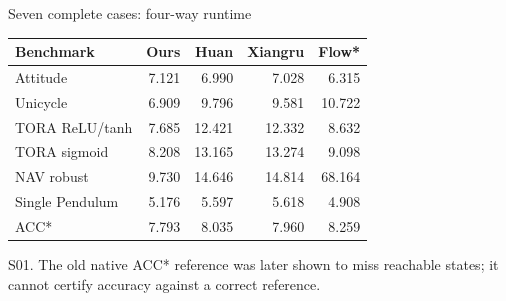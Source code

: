 \documentclass[aspectratio=169,11pt]{beamer}
\newcommand{\src}[1]{\par\vfill{\fontsize{7}{9}\selectfont\color{gray}#1\par}}
\begin{document}
\begin{frame}[t]{Seven complete cases: four-way runtime}
\relax
\relax
{\small\setlength{\tabcolsep}{3.2pt}\renewcommand{\arraystretch}{1.18}
\noindent\begin{tabular*}{\linewidth}{@{\extracolsep{\fill}}lrrrr@{}}\toprule
\textbf{Benchmark} & \textbf{Ours} & \textbf{Huan} & \textbf{Xiangru} & \textbf{Flow*}\\ \midrule
Attitude & 7.121 & 6.990 & 7.028 & 6.315\\
Unicycle & 6.909 & 9.796 & 9.581 & 10.722\\
TORA ReLU/tanh & 7.685 & 12.421 & 12.332 & 8.632\\
TORA sigmoid & 8.208 & 13.165 & 13.274 & 9.098\\
NAV robust & 9.730 & 14.646 & 14.814 & 68.164\\
Single Pendulum & 5.176 & 5.597 & 5.618 & 4.908\\
ACC* & 7.793 & 8.035 & 7.960 & 8.259\\
\bottomrule\end{tabular*}\par{}}
\src{S01. The old native ACC* reference was later shown to miss reachable states; it cannot certify accuracy against a correct reference.}
\end{frame}
\end{document}
